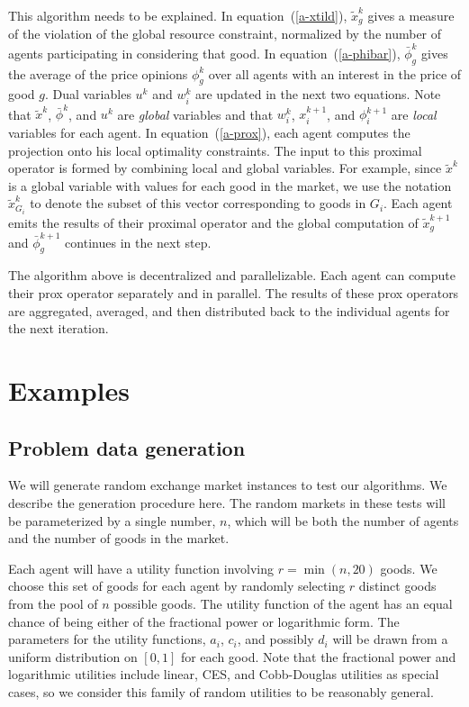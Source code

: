\documentclass[12pt]{article}
\begin{document}
This algorithm needs to be explained.
In equation~(\ref{a-xtild}), $\tilde{x}^k_g$ gives a measure of the violation of
the global resource constraint, normalized by the number of agents participating
in considering that good.
In equation~(\ref{a-phibar}), $\bar{\phi}^k_g$ gives the average of the price
opinions $\phi^k_g$ over all agents with an interest in the price of good $g$.
Dual variables $u^k$ and $w^k_i$ are updated in the next two equations.
Note that $\tilde{x}^k$, $\bar{\phi}^k$, and $u^k$ are \emph{global} variables
and that $w_i^k$, $x_i^{k+1}$, and $\phi_i^{k+1}$ are \emph{local} variables
for each agent. In equation~(\ref{a-prox}), each agent computes the projection
onto his local optimality constraints.
The input to this proximal operator is formed by combining
local and global variables.
For example, since $\tilde{x}^k$ is a global variable with values for each good in the market, we use the notation $\tilde{x}^k_{G_i}$ to denote the subset of this vector corresponding to goods in $G_i$.
Each agent emits the results of their proximal operator and the
global computation of $\tilde{x}^{k+1}_g$ and $\bar{\phi}^{k+1}_g$ continues in the next step.

The algorithm above is decentralized and parallelizable.
Each agent can compute their prox operator separately and in parallel.
The results of these prox operators are aggregated, averaged, and then distributed
back to the individual agents for the next iteration.





\section{Examples}
\label{sec:examples}
\subsection{Problem data generation}
\label{sec:random_prob}
We will generate random exchange market instances to test our algorithms.
We describe the generation procedure here.
The random markets in these tests will be parameterized
by a single number, $n$, which will be both the
number of agents and the number of goods in the market.

Each agent will have a utility function involving $r = \min(n,20)$
goods.
We choose this set of goods for each agent by randomly selecting
$r$ distinct goods from the pool of $n$ possible goods.
The utility function of the agent has an equal chance of 
being either of the fractional power or logarithmic form.
The parameters for the utility functions, $a_i$, $c_i$, and possibly
$d_i$ will be drawn from a uniform distribution on $[0,1]$ for each good.
Note that the fractional power and logarithmic utilities include
linear, CES, and Cobb-Douglas utilities as special cases,
so we consider this family of random utilities to be reasonably general.
\end{document}
